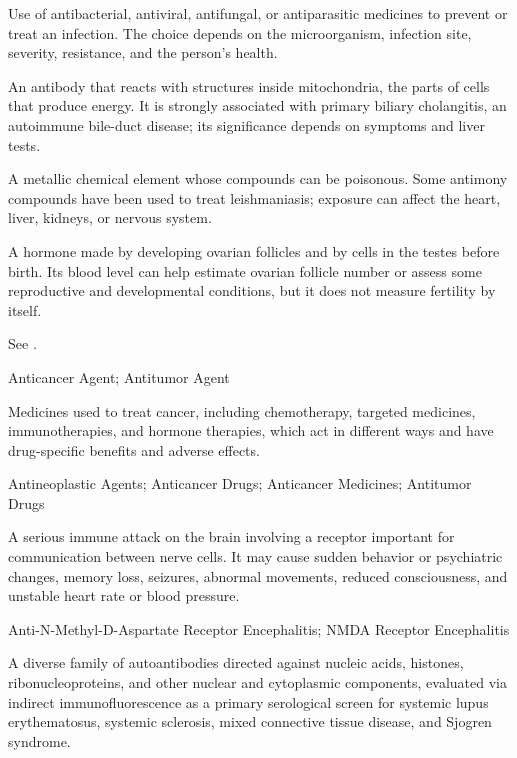  Use of antibacterial, antiviral, antifungal, or antiparasitic medicines to prevent or treat an infection. The choice depends on the microorganism, infection site, severity, resistance, and the person’s health.

 An antibody that reacts with structures inside mitochondria, the parts of cells that produce energy. It is strongly associated with primary biliary cholangitis, an autoimmune bile-duct disease; its significance depends on symptoms and liver tests.

 A metallic chemical element whose compounds can be poisonous. Some antimony compounds have been used to treat leishmaniasis; exposure can affect the heart, liver, kidneys, or nervous system.

 A hormone made by developing ovarian follicles and by cells in the testes before birth. Its blood level can help estimate ovarian follicle number or assess some reproductive and developmental conditions, but it does not measure fertility by itself.

 See .

\synonyms
Anticancer Agent; Antitumor Agent

 Medicines used to treat cancer, including chemotherapy, targeted medicines, immunotherapies, and hormone therapies, which act in different ways and have drug-specific benefits and adverse effects.

\synonyms
Antineoplastic Agents; Anticancer Drugs; Anticancer Medicines; Antitumor Drugs

 A serious immune attack on the brain involving a receptor important for communication between nerve cells. It may cause sudden behavior or psychiatric changes, memory loss, seizures, abnormal movements, reduced consciousness, and unstable heart rate or blood pressure.

\synonyms
Anti-N-Methyl-D-Aspartate Receptor Encephalitis; NMDA Receptor Encephalitis

 A diverse family of autoantibodies directed against nucleic acids, histones, ribonucleoproteins, and other nuclear and cytoplasmic components, evaluated via indirect immunofluorescence as a primary serological screen for systemic lupus erythematosus, systemic sclerosis, mixed connective tissue disease, and Sjogren syndrome.


